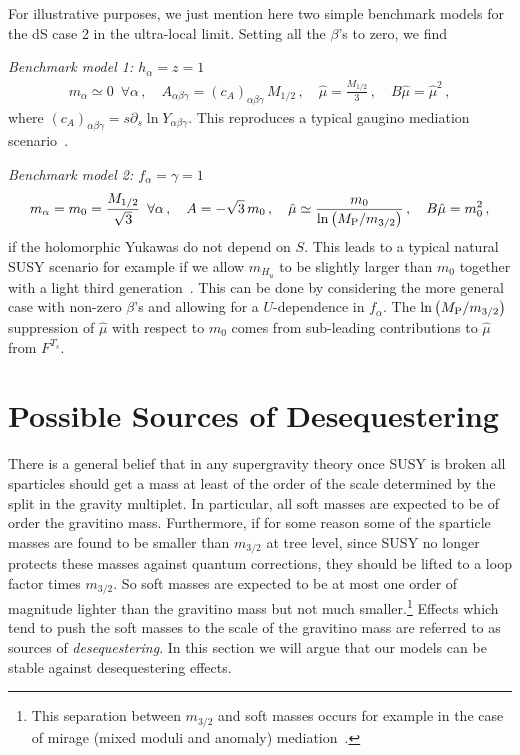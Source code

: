 \documentclass[12pt,a4paper]{book}
\begin{document}
For illustrative purposes, we just mention here two simple benchmark models for the dS case 2 in the ultra-local limit. Setting all the $\beta$'s to zero, we find

\medskip
\emph{Benchmark model 1: $h_\alpha=z=1$}
\begin{align}
m_\alpha \simeq 0\,\,\,\forall\alpha\,,\quad A_{\alpha\beta\gamma} = (c_A)_{\alpha\beta\gamma}\,M_{1/2}\,,
\quad\hat\mu= \frac{M_{1/2}}{3} \,,\quad B\hat\mu = \hat\mu^2\,,
\end{align}
where $(c_A)_{\alpha\beta\gamma}=s\partial_s \ln Y_{\alpha\beta\gamma}$.
This reproduces a typical gaugino mediation scenario~\cite{Schmaltz:2000gy,Yanagida:2013ah}.

\medskip
\emph{Benchmark model 2: $f_\alpha=\gamma=1$}
\begin{align}
m_\alpha = m_0 = \frac{M_{1/2}}{\sqrt{3}}\,\,\,\forall\alpha\,,\quad A = -\sqrt{3}\,m_0\,,
\quad\hat\mu \simeq \frac{m_0}{\ln\left(M_{\rm P}/m_{3/2}\right)}\,,\quad B\hat\mu = m_0^2\,,
\end{align}
if the holomorphic Yukawas do not depend on $S$. This leads to a typical natural SUSY scenario for example if we allow $m_{H_u}$ to be slightly larger than $m_0$ together with a light third generation~\cite{Baer:2012uy}. This can be done by considering the more general case with non-zero $\beta$'s and allowing for a $U$-dependence in $f_\alpha$. The $\ln\left(M_{\rm P}/m_{3/2}\right)$ suppression of $\hat\mu$ with respect to $m_0$ comes from sub-leading contributions to $\hat\mu$ from $F^{T_s}$.

\section{Possible Sources of Desequestering}
\label{sec:DesequesteringSources}

There is a general belief that in any supergravity theory once SUSY is broken all sparticles should get a mass at least of the order of the scale determined by the split in the gravity multiplet. In particular, all soft masses are expected to be of order the gravitino mass. Furthermore, if for some reason some of the sparticle masses are found to be smaller than $m_{3/2}$ at tree level, since SUSY no longer protects these masses against quantum corrections, they should be lifted to a loop factor times $m_{3/2}$. So soft masses are expected to be at most one order of magnitude lighter than the gravitino mass but not much smaller.\footnote{This separation between $m_{3/2}$ and soft masses occurs for example in the case of mirage (mixed moduli and anomaly) mediation~\cite{LoaizaBrito:2005fa,Choi:2005hd}.} Effects which tend to push the soft masses to the scale of the gravitino mass are referred to as sources of \textit{desequestering}. In this section we will argue that our models can be stable against desequestering effects.
\end{document}

